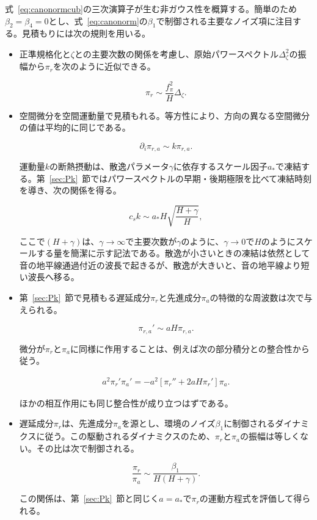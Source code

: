\documentclass[a4paper,11pt]{ltjsarticle}
\numberwithin{equation}{section}
\def\pia{\pi_{a}}
\def\pir{\pi_{r}}
\newcommand{\Eq}[1]{Eq.~(\ref{#1})}
\newcommand{\Sec}[1]{Sec.~\ref{#1}}
\renewcommand{\Eq}[1]{式~\eqref{#1}}
\renewcommand{\Sec}[1]{第~\ref{#1}~節}
\begin{document}
\Eq{eq:canonormcub}の三次演算子が生む非ガウス性を概算する。簡単のため$\beta_2=\beta_4=0$とし、\Eq{eq:canonorm}の$\beta_1$で制御される主要なノイズ項に注目する。見積もりには次の規則を用いる。
\begin{itemize}
\item 正準規格化と$\zeta$との主要次数の関係を考慮し、原始パワースペクトル$\Delta_\zeta^2$の振幅から$\pir$を次のように近似できる。

\begin{equation}\label{eq:rule1}
        \pir\sim\frac{f_{\pi}^{2}}{H}\Delta_{\zeta}.
    \end{equation}

\item 空間微分を空間運動量で見積もれる。等方性により、方向の異なる空間微分の値は平均的に同じである。

\begin{equation}\label{eq:rule2}
        \partial_{i}\pi_{r,a}\sim k\pi_{r,a}.
    \end{equation}

運動量$k$の断熱摂動は、散逸パラメータ$\gamma$に依存するスケール因子$a_*$で凍結する\cite{LopezNacir:2011kk}。\Sec{sec:Pk}ではパワースペクトルの早期・後期極限を比べて凍結時刻を導き、次の関係を得る。

\begin{equation}\label{eq:rule3}
        c_s k\sim a_* H \sqrt{\frac{H+\gamma}{H}},
    \end{equation}

ここで$(H+\gamma)$は、$\gamma\to\infty$で主要次数が$\gamma$のように、$\gamma\to0$で$H$のようにスケールする量を簡潔に示す記法である。散逸が小さいときの凍結は依然として音の地平線通過付近の波長で起きるが、散逸が大きいと、音の地平線より短い波長へ移る。
\item \Sec{sec:Pk}で見積もる遅延成分$\pir$と先進成分$\pia$の特徴的な周波数は次で与えられる。

\begin{equation}\label{eq:rule4}
        \pi_{r,a}'\sim a H \pi_{r,a}.
    \end{equation}

微分が$\pir$と$\pia$に同様に作用することは、例えば次の部分積分との整合性から従う。

\begin{align}
        a^2 \pir'\pia' = - a^2 \left[\pir'' + 2 a H \pir' \right]  \pia.
    \end{align}

ほかの相互作用にも同じ整合性が成り立つはずである。
\item 遅延成分$\pir$は、先進成分$\pia$を源とし、環境のノイズ$\beta_1$に制御されるダイナミクスに従う\cite{kamenev_2011}。この駆動されるダイナミクスのため、$\pir$と$\pia$の振幅は等しくない。その比は次で制御される。

\begin{equation}\label{eq:rule5}
        \frac{\pir}{\pia} \sim \frac{\beta_1}{H(H+\gamma)}.
    \end{equation}

この関係は、\Sec{sec:Pk}と同じく$a=a_*$で$\pir$の運動方程式を評価して得られる。
\end{itemize}
\end{document}
